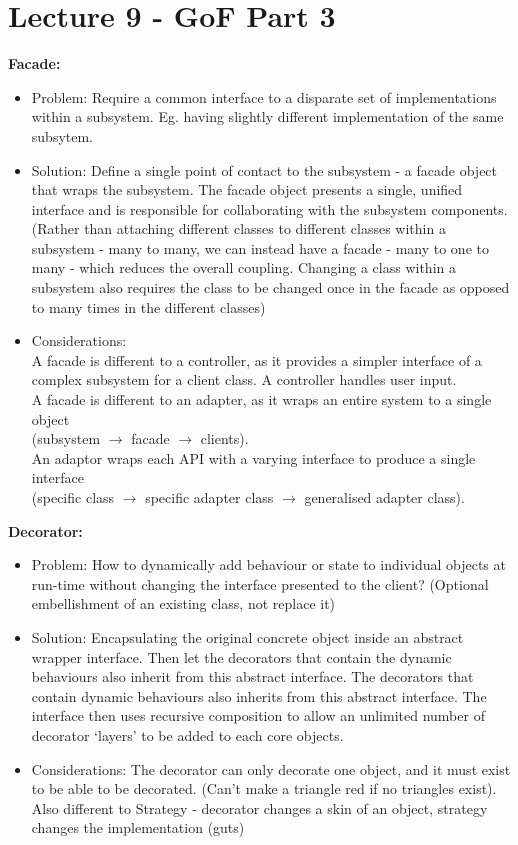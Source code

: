 \documentclass[a4paper,10pt]{article}
\begin{document}
\section*{Lecture 9 - GoF Part 3}
\textcolor{Periwinkle}{\textbf{Facade:}}
\renewcommand{\labelitemi}{\textperiodcentered}
\begin{itemize}
\item\textcolor{Periwinkle}{Problem:} Require a common interface to a disparate set of implementations within a subsystem. Eg. having slightly different implementation of the same subsytem.
\item\textcolor{Periwinkle}{Solution:} Define a single point of contact to the subsystem - a facade object that wraps the subsystem. The facade object presents a single, unified interface and is responsible for collaborating with the subsystem components. (Rather than attaching different classes to different classes within a subsystem - many to many, we can instead have a facade - many to one to many - which reduces the overall coupling. Changing a class within a subsystem also requires the class to be changed once in the facade as opposed to many times in the different classes)
\item\textcolor{Periwinkle}{Considerations:} \\
A facade is different to a controller, as it provides a simpler interface of a complex subsystem for a client class. A controller handles user input. \\ 
A facade is different to an adapter, as it wraps an entire system to a single object \\ 
(subsystem $\rightarrow$ facade $\rightarrow$ clients). \\
An adaptor wraps each API with a varying interface to produce a single interface \\
(specific class $\rightarrow$ specific adapter class $\rightarrow$ generalised adapter class). 
\end{itemize}
\textcolor{Periwinkle}{\textbf{Decorator:}}
\renewcommand{\labelitemi}{\textperiodcentered}
\begin{itemize}
\item\textcolor{Periwinkle}{Problem:} How to dynamically add behaviour or state to individual objects at run-time without changing the interface presented to the client? (Optional embellishment of an existing class, not replace it) 
\item\textcolor{Periwinkle}{Solution:} Encapsulating the original concrete object inside an abstract wrapper interface. Then let the decorators that contain the dynamic behaviours also inherit from this abstract interface. The decorators that contain dynamic behaviours also inherits from this abstract interface. The interface then uses recursive composition to allow an unlimited number of decorator `layers' to be added to each core objects. 
\item\textcolor{Periwinkle}{Considerations:} The decorator can only decorate one object, and it must exist to be able to be decorated. (Can't make a triangle red if no triangles exist). Also different to Strategy - decorator changes a skin of an object, strategy changes the implementation (guts)
\end{itemize}
\end{document}
